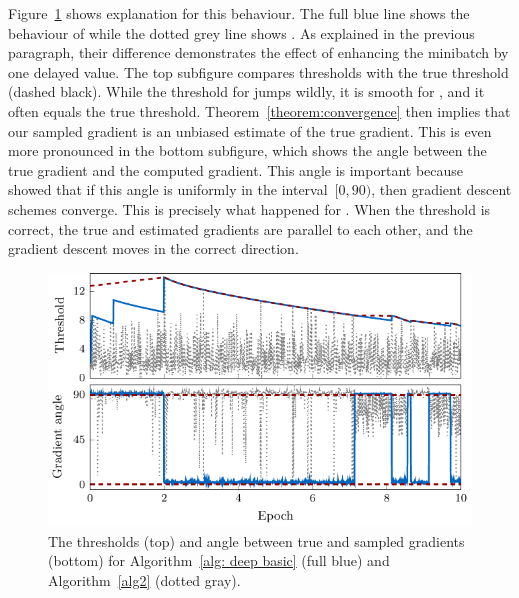 Figure~\ref{fig:thresholds2} shows explanation for this behaviour. The full blue line shows the behaviour of \DeepTopPush while the dotted grey line shows \PatMatNP. As explained in the previous paragraph, their difference demonstrates the effect of enhancing the minibatch by one delayed value. The top subfigure compares thresholds with the true threshold (dashed black). While the threshold for \PatMatNP jumps wildly, it is smooth for \DeepTopPush, and it often equals the true threshold. Theorem~\ref{theorem:convergence} then implies that our sampled gradient is an unbiased estimate of the true gradient. This is even more pronounced in the bottom subfigure, which shows the angle between the true gradient and the computed gradient. This angle is important because~\cite{nocedal2006numerical} showed that if this angle is uniformly in the interval~$[0,90)$, then gradient descent schemes converge. This is precisely what happened for \DeepTopPush. When the threshold is correct, the true and estimated gradients are parallel to each other, and the gradient descent moves in the correct direction.

\begin{figure}[!ht]
  \centering
  \includegraphics[width = \linewidth]{images/deep_thresholds.pdf}
  \caption{The thresholds (top) and angle between true and sampled gradients (bottom) for Algorithm~\ref{alg: deep basic} (full blue) and Algorithm~\ref{alg2} (dotted gray).}
  \label{fig:thresholds2}
\end{figure}
